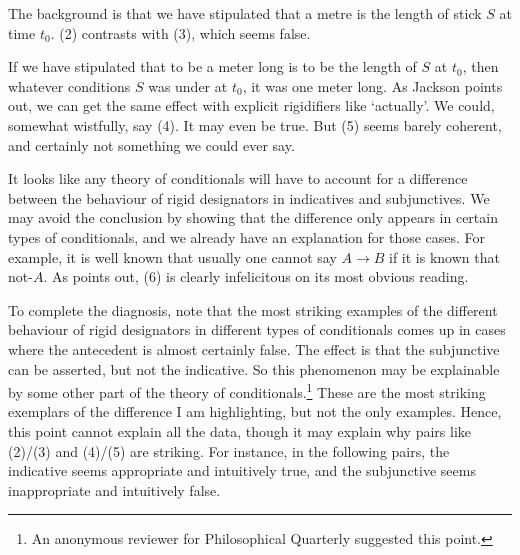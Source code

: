 
\noindent The background is that we have stipulated that a metre is the length of stick \(S\) at time \(t_0\). (2) contrasts with (3), which seems false.


\noindent If we have stipulated that to be a meter long is to be the length of \(S\) at \(t_0\), then whatever conditions \(S\) was under at \(t_0\), it was one meter long. As Jackson points out, we can get the same effect with explicit rigidifiers like `actually'. We could, somewhat wistfully, say (4). It may even be true. But (5) seems barely coherent, and certainly not something we could ever say.


\noindent It looks like any theory of conditionals will have to account for a difference between the behaviour of rigid designators in indicatives and subjunctives. We may avoid the conclusion by showing that the difference only appears in certain types of conditionals, and we already have an explanation for those cases. For example, it is well known that usually one cannot say \(A \rightarrow B\) if it is known that not-\(A\). As \citet{Dudman1994} points out, (6) is clearly infelicitous on its most obvious reading.


\noindent To complete the diagnosis, note that the most striking examples of the different behaviour of rigid designators in different types of conditionals comes up in cases where the antecedent is almost certainly false. The effect is that the subjunctive can be asserted, but not the indicative. So this phenomenon may be explainable by some other part of the theory of conditionals.\footnote{An anonymous reviewer for Philosophical Quarterly suggested this point.} These are the most striking exemplars of the difference I am highlighting, but not the only examples. Hence, this point cannot explain all the data, though it may explain why pairs like (2)/(3) and (4)/(5) are striking. For instance, in the following pairs, the indicative seems appropriate and intuitively true, and the subjunctive seems inappropriate and intuitively false.

